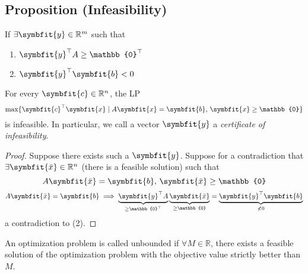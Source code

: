 \begin{thmbox}
    \subsection{Proposition (Infeasibility)}
    If
    $\exists \symbfit{y}\in\mathbb{R}^m$ such that
    \begin{enumerate}[(1)]
        \item $\symbfit{y}^\top A\ge\mathbb{0}^\top $
        \item $\symbfit{y}^\top \symbfit{b}<0$
    \end{enumerate}
    For every $\symbfit{c}\in\mathbb{R}^n$, the LP
    \[\max \{\symbfit{c}^\top \symbfit{x} \mid A\symbfit{x}=\symbfit{b}\text{, }
    \symbfit{x}\ge\mathbb{0}\}\]
    is infeasible. In particular, we call a vector $\symbfit{y}$ a \emph{certificate of infeasibility}.
\end{thmbox}

\begin{proof}
Suppose there exists such a $ \symbfit{y} $.
Suppose for a contradiction that $\exists\symbfit{\bar{x}}\in\mathbb{R}^n$ 
(there is a feasible solution)
such that
\[A\symbfit{\bar{x}}=\symbfit{b} \text{, }\symbfit{\bar{x}}\ge \mathbb{0}\]
\[
    A\symbfit{\bar{x}}=\symbfit{b}
    \implies
    \underbrace{\symbfit{y}^\top A}_{\ge\mathbb{0}^\top }
    \underbrace{\symbfit{\bar{x}}}_{\ge\mathbb{0}}
    =\underbrace{\symbfit{y}^\top \symbfit{b}}_{\nless 0}
\]
a contradiction to (2).
\end{proof}

An optimization problem is called unbounded if $\forall M\in\mathbb{R}$, there
exists a feasible solution of the optimization problem with the objective 
value strictly better than $M$.
